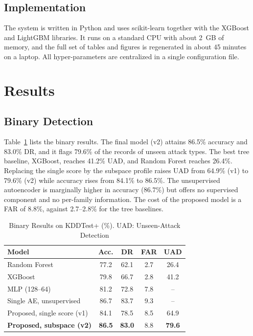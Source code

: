 \documentclass[journal]{IEEEtran}
\begin{document}
\subsection{Implementation}
The system is written in Python and uses scikit-learn \cite{pedregosa2011} together with the XGBoost and LightGBM libraries. It runs on a standard CPU with about 2~GB of memory, and the full set of tables and figures is regenerated in about 45 minutes on a laptop. All hyper-parameters are centralized in a single configuration file.

\section{Results}
\label{sec:results}
\subsection{Binary Detection}
Table~\ref{tab:binary} lists the binary results. The final model (v2) attains 86.5\% accuracy and 83.0\% DR, and it flags 79.6\% of the records of unseen attack types. The best tree baseline, XGBoost, reaches 41.2\% UAD, and Random Forest reaches 26.4\%. Replacing the single score by the subspace profile raises UAD from 64.9\% (v1) to 79.6\% (v2) while accuracy rises from 84.1\% to 86.5\%. The unsupervised autoencoder is marginally higher in accuracy (86.7\%) but offers no supervised component and no per-family information. The cost of the proposed model is a FAR of 8.8\%, against 2.7--2.8\% for the tree baselines.

\begin{table}[!t]
\centering
\caption{Binary Results on KDDTest+ (\%). UAD: Unseen-Attack Detection}
\label{tab:binary}
\footnotesize
\begin{tabular}{lcccc}
\toprule
Model & Acc. & DR & FAR & UAD \\
\midrule
Random Forest & 77.2 & 62.1 & 2.7 & 26.4 \\
XGBoost & 79.8 & 66.7 & 2.8 & 41.2 \\
MLP (128--64) & 81.2 & 72.8 & 7.8 & -- \\
Single AE, unsupervised & 86.7 & 83.7 & 9.3 & -- \\
Proposed, single score (v1) & 84.1 & 78.5 & 8.5 & 64.9 \\
\textbf{Proposed, subspace (v2)} & \textbf{86.5} & \textbf{83.0} & 8.8 & \textbf{79.6} \\
\bottomrule
\end{tabular}
\end{table}
\end{document}
